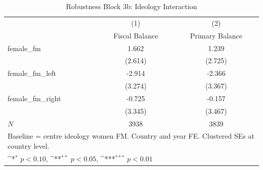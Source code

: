 \begin{table}[htbp]\centering
\def\sym#1{\ifmmode^{#1}\else\(^{#1}\)\fi}
\caption{Robustness Block 3b: Ideology Interaction}
\begin{tabular}{l*{2}{c}}
\hline\hline
            &\multicolumn{1}{c}{(1)}&\multicolumn{1}{c}{(2)}\\
            &\multicolumn{1}{c}{Fiscal Balance}&\multicolumn{1}{c}{Primary Balance}\\
\hline
female\_fm   &       1.662         &       1.239         \\
            &     (2.614)         &     (2.725)         \\
[1em]
female\_fm\_left&      -2.914         &      -2.366         \\
            &     (3.274)         &     (3.367)         \\
[1em]
female\_fm\_right&      -0.725         &      -0.157         \\
            &     (3.345)         &     (3.467)         \\
\hline
\(N\)       &        3938         &        3839         \\
\hline\hline
\multicolumn{3}{l}{\footnotesize Baseline = centre ideology women FM.  Country and year FE. Clustered SEs at country level.}\\
\multicolumn{3}{l}{\footnotesize \sym{*} \(p<0.10\), \sym{**} \(p<0.05\), \sym{***} \(p<0.01\)}\\
\end{tabular}
\end{table}
